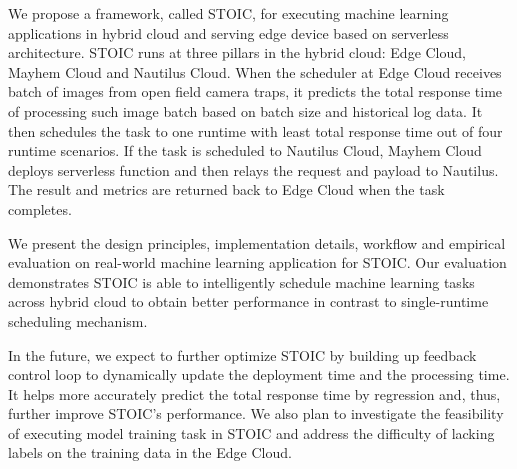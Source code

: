 We propose a framework, called STOIC, for executing machine learning applications in hybrid cloud and serving edge device based on serverless architecture. STOIC runs at three pillars in the hybrid cloud: Edge Cloud, Mayhem Cloud and Nautilus Cloud. When the scheduler at Edge Cloud receives batch of images from open field camera traps, it predicts the total response time of processing such image batch based on batch size and historical log data. It then schedules the task to one runtime with least total response time out of four runtime scenarios. If the task is scheduled to Nautilus Cloud, Mayhem Cloud deploys serverless function and then relays the request and payload to Nautilus. The result and metrics are returned back to Edge Cloud when the task completes.

We present the design principles, implementation details, workflow and empirical evaluation on real-world machine learning application for STOIC. Our evaluation demonstrates STOIC is able to intelligently schedule machine learning tasks across hybrid cloud to obtain better performance in contrast to single-runtime scheduling mechanism.

In the future, we expect to further optimize STOIC by building up feedback control loop to dynamically update the deployment time and the processing time. It helps more accurately predict the total response time by regression and, thus, further improve STOIC's performance. We also plan to investigate the feasibility of executing model training task in STOIC and address the difficulty of lacking labels on the training data in the Edge Cloud.